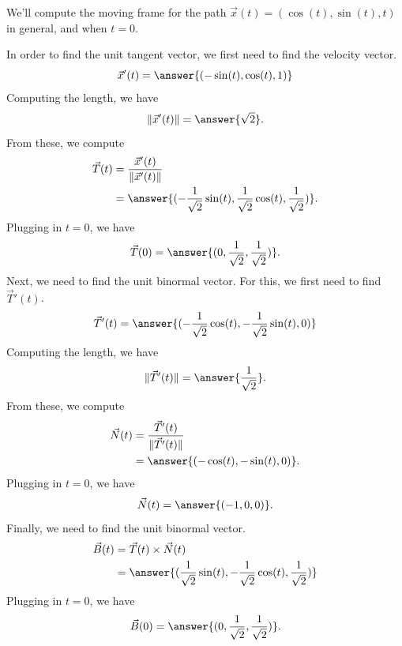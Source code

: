 \documentclass{ximera}
\begin{document}
\begin{example}
We'll compute the moving frame for the path $\vec{x}(t) = (\cos(t),\sin(t), t)$ in general, and when $t = 0$.

In order to find the unit tangent vector, we first need to find the velocity vector.
\[
\vec{x}'(t) = \answer{(-\sin(t), \cos(t), 1)}
\]
Computing the length, we have
\[
\|\vec{x}'(t)\| = \answer{\sqrt{2}}.
\]
From these, we compute
\begin{align*}
\vec{T}(t) &= \dfrac{\vec{x}'(t)}{\|\vec{x}'(t)\|}\\
&= \answer{(-\frac{1}{\sqrt{2}}\sin(t), \frac{1}{\sqrt{2}}\cos(t), \frac{1}{\sqrt{2}})}.
\end{align*}
Plugging in $t=0$, we have
\[
\vec{T}(0) = \answer{(0,\frac{1}{\sqrt{2}},\frac{1}{\sqrt{2}})}.
\]
Next, we need to find the unit binormal vector. For this, we first need to find $\vec{T}'(t)$.
\[
\vec{T}'(t) = \answer{(-\frac{1}{\sqrt{2}}\cos(t), -\frac{1}{\sqrt{2}}\sin(t), 0)}
\]
Computing the length, we have
\[
\|\vec{T}'(t)\| = \answer{\frac{1}{\sqrt{2}}}.
\]
From these, we compute
\begin{align*}
\vec{N}(t) &= \dfrac{\vec{T}'(t)}{\|\vec{T}'(t)\|}\\
&= \answer{(-\cos(t), -\sin(t),0)}.
\end{align*}
Plugging in $t=0$, we have
\[
\vec{N}(t) = \answer{(-1,0,0)}.
\]
Finally, we need to find the unit binormal vector.
\begin{align*}
\vec{B}(t) &= \vec{T}(t)\times\vec{N}(t)\\
&= \answer{(\frac{1}{\sqrt{2}}\sin(t), -\frac{1}{\sqrt{2}}\cos(t), \frac{1}{\sqrt{2}})}
\end{align*}
Plugging in $t=0$, we have
\[
\vec{B}(0) = \answer{(0, \frac{1}{\sqrt{2}}, \frac{1}{\sqrt{2}})}.
\]


\end{example}
\end{document}
